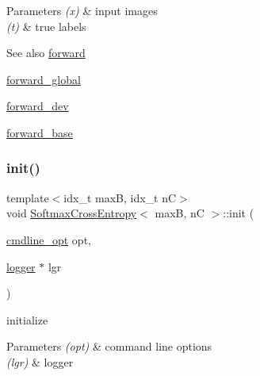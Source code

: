 \begin{DoxyParams}{Parameters}
{\em (x)} & input images \\
\hline
{\em (t)} & true labels \\
\hline
\end{DoxyParams}
\begin{DoxySeeAlso}{See also}
\hyperlink{structSoftmaxCrossEntropy_ad9123a2a40bac45237466faf0cff3fbc}{forward} 

\hyperlink{softmaxcrossentropy_8h_a578aeeb166bd06e800d9b396eab48b35}{forward\+\_\+global} 

\hyperlink{structSoftmaxCrossEntropy_ac64934c6de42a065529dceafa38c157a}{forward\+\_\+dev} 

\hyperlink{structSoftmaxCrossEntropy_a8a478a94bbd9fd17e08fe86cb758d90f}{forward\+\_\+base} 
\end{DoxySeeAlso}
\mbox{\label{structSoftmaxCrossEntropy_ad531aa32fa665c1596f686eae4b8e008}} 
\subsubsection{\texorpdfstring{init()}{init()}}
{\footnotesize\ttfamily template$<$idx\+\_\+t maxB, idx\+\_\+t nC$>$ \\
void \hyperlink{structSoftmaxCrossEntropy}{Softmax\+Cross\+Entropy}$<$ maxB, nC $>$\+::init (\begin{DoxyParamCaption}\item[{\hyperlink{structcmdline__opt}{cmdline\+\_\+opt}}]{opt,  }\item[{\hyperlink{structlogger}{logger} $\ast$}]{lgr }\end{DoxyParamCaption})\hspace{0.3cm}{\ttfamily [inline]}}



initialize 


\begin{DoxyParams}{Parameters}
{\em (opt)} & command line options \\
\hline
{\em (lgr)} & logger \\
\hline
\end{DoxyParams}
\mbox{\label{structSoftmaxCrossEntropy_a4f2a21b5bd9663d832b618f0b26a01df}} 
